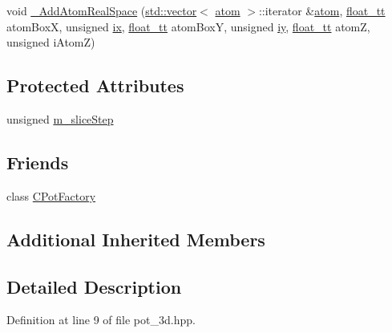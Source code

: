 \begin{DoxyCompactItemize}
\item 
void \hyperlink{class_q_s_t_e_m_1_1_c3_d_potential_a06e96554ed03efe24c610f778696cd85}{\-\_\-\-Add\-Atom\-Real\-Space} (\hyperlink{qmb_8m_af54b69a32590de218622e869b06b47b3}{std\-::vector}$<$ \hyperlink{namespace_q_s_t_e_m_a402dabc31a7a1fe906d0cdd138c69686}{atom} $>$\-::iterator \&\hyperlink{namespace_q_s_t_e_m_a402dabc31a7a1fe906d0cdd138c69686}{atom}, \hyperlink{namespace_q_s_t_e_m_a915d7caa497280d9f927c4ce8d330e47}{float\-\_\-tt} atom\-Box\-X, unsigned \hyperlink{_display_model_properties_8m_a76b405b72b88bde9488209ac06ddb714}{ix}, \hyperlink{namespace_q_s_t_e_m_a915d7caa497280d9f927c4ce8d330e47}{float\-\_\-tt} atom\-Box\-Y, unsigned \hyperlink{_display_model_properties_8m_af4c5cec9fce175f73b7da5ecd33c2af6}{iy}, \hyperlink{namespace_q_s_t_e_m_a915d7caa497280d9f927c4ce8d330e47}{float\-\_\-tt} atom\-Z, unsigned i\-Atom\-Z)
\end{DoxyCompactItemize}
\subsection*{Protected Attributes}
\begin{DoxyCompactItemize}
\item 
unsigned \hyperlink{class_q_s_t_e_m_1_1_c3_d_potential_a50fb67b2668c1b5915c20b3d195e1251}{m\-\_\-slice\-Step}
\end{DoxyCompactItemize}
\subsection*{Friends}
\begin{DoxyCompactItemize}
\item 
class \hyperlink{class_q_s_t_e_m_1_1_c3_d_potential_a6759f7ccac4d3744ec78fd194903e752}{C\-Pot\-Factory}
\end{DoxyCompactItemize}
\subsection*{Additional Inherited Members}


\subsection{Detailed Description}


Definition at line 9 of file pot\-\_\-3d.\-hpp.



